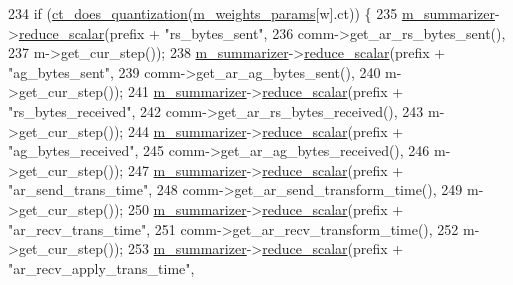 \begin{DoxyCode}
234   \textcolor{keywordflow}{if} (\hyperlink{classlbann_1_1lbann__callback__imcomm_a8b29853e49c58cf737a741c503737705}{ct\_does\_quantization}(\hyperlink{classlbann_1_1lbann__callback__imcomm_a32a0319c91aff324cb3468de4f31dd50}{m\_weights\_params}[w].ct)) \{
235     \hyperlink{classlbann_1_1lbann__callback_a277d46138184f85f161a8263b8322c76}{m\_summarizer}->\hyperlink{classlbann_1_1lbann__summary_a3e0b9aae1f80403a195567fd25ea2525}{reduce\_scalar}(prefix + \textcolor{stringliteral}{"rs\_bytes\_sent"},
236                                 comm->get\_ar\_rs\_bytes\_sent(),
237                                 m->get\_cur\_step());
238     \hyperlink{classlbann_1_1lbann__callback_a277d46138184f85f161a8263b8322c76}{m\_summarizer}->\hyperlink{classlbann_1_1lbann__summary_a3e0b9aae1f80403a195567fd25ea2525}{reduce\_scalar}(prefix + \textcolor{stringliteral}{"ag\_bytes\_sent"},
239                                 comm->get\_ar\_ag\_bytes\_sent(),
240                                 m->get\_cur\_step());
241     \hyperlink{classlbann_1_1lbann__callback_a277d46138184f85f161a8263b8322c76}{m\_summarizer}->\hyperlink{classlbann_1_1lbann__summary_a3e0b9aae1f80403a195567fd25ea2525}{reduce\_scalar}(prefix + \textcolor{stringliteral}{"rs\_bytes\_received"},
242                                 comm->get\_ar\_rs\_bytes\_received(),
243                                 m->get\_cur\_step());
244     \hyperlink{classlbann_1_1lbann__callback_a277d46138184f85f161a8263b8322c76}{m\_summarizer}->\hyperlink{classlbann_1_1lbann__summary_a3e0b9aae1f80403a195567fd25ea2525}{reduce\_scalar}(prefix + \textcolor{stringliteral}{"ag\_bytes\_received"},
245                                 comm->get\_ar\_ag\_bytes\_received(),
246                                 m->get\_cur\_step());
247     \hyperlink{classlbann_1_1lbann__callback_a277d46138184f85f161a8263b8322c76}{m\_summarizer}->\hyperlink{classlbann_1_1lbann__summary_a3e0b9aae1f80403a195567fd25ea2525}{reduce\_scalar}(prefix + \textcolor{stringliteral}{"ar\_send\_trans\_time"},
248                                 comm->get\_ar\_send\_transform\_time(),
249                                 m->get\_cur\_step());
250     \hyperlink{classlbann_1_1lbann__callback_a277d46138184f85f161a8263b8322c76}{m\_summarizer}->\hyperlink{classlbann_1_1lbann__summary_a3e0b9aae1f80403a195567fd25ea2525}{reduce\_scalar}(prefix + \textcolor{stringliteral}{"ar\_recv\_trans\_time"},
251                                 comm->get\_ar\_recv\_transform\_time(),
252                                 m->get\_cur\_step());
253     \hyperlink{classlbann_1_1lbann__callback_a277d46138184f85f161a8263b8322c76}{m\_summarizer}->\hyperlink{classlbann_1_1lbann__summary_a3e0b9aae1f80403a195567fd25ea2525}{reduce\_scalar}(prefix + \textcolor{stringliteral}{"ar\_recv\_apply\_trans\_time"},

\end{DoxyCode}

